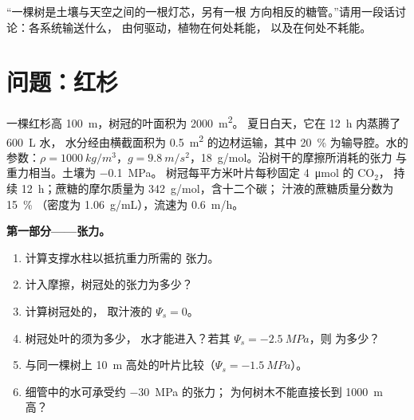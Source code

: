 \begin{exercise}[$\star\star\star$]\label{exo:b1:plant-transport:12}
“一棵树是土壤与天空之间的一根灯芯，另有一根
方向相反的糖管。”请用一段话讨论：各系统输送什么，
由何驱动，植物在何处耗能，
以及在何处不耗能。
\end{exercise}

\section{问题：红杉}

\begin{problem}
\label{pb:b1:plant-transport:1}
一棵红杉高 \qty{100}{m}，树冠的叶面积为 \qty{2000}{m^2}。
夏日白天，它在 \qty{12}{h} 内蒸腾了 \qty{600}{L} 水，
水分经由横截面积为 \qty{0.5}{m^2} 的边材运输，其中 \qty{20}{\%}
为输导腔。水的参数：$\rho = \qty{1000}{kg/m^3}$，$g =
\qty{9.8}{m/s^2}$，\qty{18}{g/mol}。沿树干的摩擦所消耗的张力
与重力相当。土壤为 \qty{-0.1}{MPa}。
树冠每平方米叶片每秒固定 \qty{4}{\micro mol} 的 $\mathrm{CO_2}$，
持续 \qty{12}{h}；蔗糖的摩尔质量为 \qty{342}{g/mol}，含十二个碳；
汁液的蔗糖质量分数为 \qty{15}{\%}
（密度为 \qty{1.06}{g/mL}），流速为 \qty{0.6}{m/h}。

\medskip
\noindent\textbf{第一部分——张力。}
\begin{enumerate}
  \item 计算支撑水柱以抵抗重力所需的
        张力。
  \item 计入摩擦，树冠处的张力为多少？
  \item 计算树冠处的，
        取汁液的 $\Psi_s = 0$。
  \item 树冠处叶的须为多少，
        水才能进入？若其 $\Psi_s = \qty{-2.5}{MPa}$，则
        为多少？
  \item 与同一棵树上 \qty{10}{m} 高处的叶片比较（$\Psi_s =
        \qty{-1.5}{MPa}$）。
  \item 细管中的水可承受约 \qty{-30}{MPa} 的张力；
        为何树木不能直接长到 \qty{1000}{m} 高？
\end{enumerate}


\end{problem}
